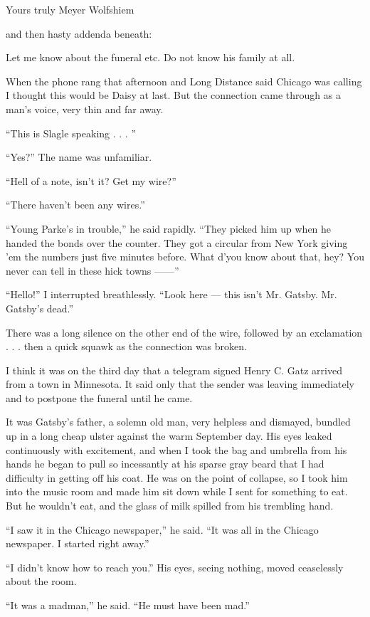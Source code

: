 \documentclass{znotebook}
\begin{document}
Yours truly Meyer Wolfshiem

and then hasty addenda beneath:

Let me know about the funeral etc. Do not know his family at all.

When the phone rang that afternoon and Long Distance said Chicago was calling I thought this would be Daisy at last. But the connection came through as a man’s voice, very thin and far away.

``This is Slagle speaking . . . ''

``Yes?'' The name was unfamiliar.

``Hell of a note, isn’t it? Get my wire?''

``There haven’t been any wires.''

``Young Parke’s in trouble,'' he said rapidly. ``They picked him up when he handed the bonds over the counter. They got a circular from New York giving ’em the numbers just five minutes before. What d’you know about that, hey? You never can tell in these hick towns ——''

``Hello!'' I interrupted breathlessly. ``Look here — this isn’t Mr. Gatsby. Mr. Gatsby’s dead.''

There was a long silence on the other end of the wire, followed by an exclamation . . . then a quick squawk as the connection was broken.

I think it was on the third day that a telegram signed Henry C. Gatz arrived from a town in Minnesota. It said only that the sender was leaving immediately and to postpone the funeral until he came.

It was Gatsby’s father, a solemn old man, very helpless and dismayed, bundled up in a long cheap ulster against the warm September day. His eyes leaked continuously with excitement, and when I took the bag and umbrella from his hands he began to pull so incessantly at his sparse gray beard that I had difficulty in getting off his coat. He was on the point of collapse, so I took him into the music room and made him sit down while I sent for something to eat. But he wouldn’t eat, and the glass of milk spilled from his trembling hand.

``I saw it in the Chicago newspaper,'' he said. ``It was all in the Chicago newspaper. I started right away.''

``I didn’t know how to reach you.'' His eyes, seeing nothing, moved ceaselessly about the room.

``It was a madman,'' he said. ``He must have been mad.''
\end{document}
